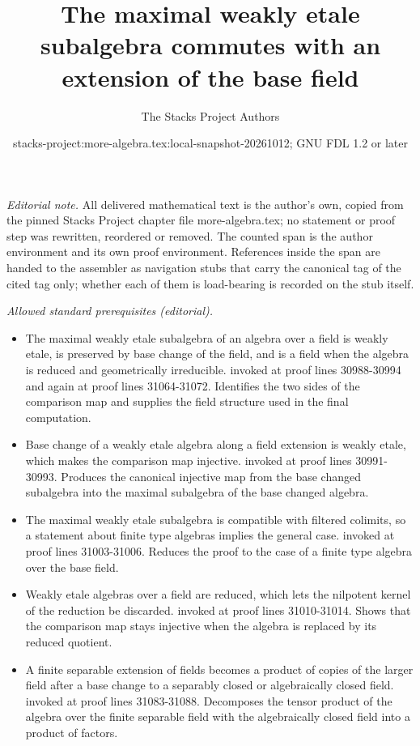 \documentclass[10pt,a4paper]{amsart}
\title{The maximal weakly etale subalgebra commutes with an extension of the base field}
\author{The Stacks Project Authors}
\date{stacks-project:more-algebra.tex:local-snapshot-20261012; GNU FDL 1.2 or later}
\theoremstyle{plain}
\theoremstyle{definition}
\theoremstyle{remark}
\numberwithin{equation}{subsection}
\begin{document}
\maketitle
\setcounter{subsection}{1}
\noindent\textit{Editorial note.} All delivered mathematical text is the author's own, copied from the pinned Stacks Project chapter file more-algebra.tex; no statement or proof step was rewritten, reordered or removed. The counted span is the author environment and its own proof environment. References inside the span are handed to the assembler as navigation stubs that carry the canonical tag of the cited tag only; whether each of them is load-bearing is recorded on the stub itself.\par\medskip
\noindent\textit{Allowed standard prerequisites (editorial).}\begin{itemize}
\item The maximal weakly etale subalgebra of an algebra over a field is weakly etale, is preserved by base change of the field, and is a field when the algebra is reduced and geometrically irreducible. invoked at proof lines 30988-30994 and again at proof lines 31064-31072. Identifies the two sides of the comparison map and supplies the field structure used in the final computation.
\item Base change of a weakly etale algebra along a field extension is weakly etale, which makes the comparison map injective. invoked at proof lines 30991-30993. Produces the canonical injective map from the base changed subalgebra into the maximal subalgebra of the base changed algebra.
\item The maximal weakly etale subalgebra is compatible with filtered colimits, so a statement about finite type algebras implies the general case. invoked at proof lines 31003-31006. Reduces the proof to the case of a finite type algebra over the base field.
\item Weakly etale algebras over a field are reduced, which lets the nilpotent kernel of the reduction be discarded. invoked at proof lines 31010-31014. Shows that the comparison map stays injective when the algebra is replaced by its reduced quotient.
\item A finite separable extension of fields becomes a product of copies of the larger field after a base change to a separably closed or algebraically closed field. invoked at proof lines 31083-31088. Decomposes the tensor product of the algebra over the finite separable field with the algebraically closed field into a product of factors.
\end{itemize}\medskip
\end{document}
